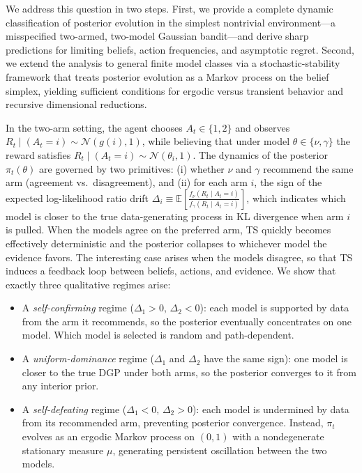 \documentclass[12pt]{article}
\begin{document}
We address this question in two steps. First, we provide a complete dynamic classification of posterior evolution in the simplest nontrivial environment---a misspecified two-armed, two-model Gaussian bandit---and derive sharp predictions for limiting beliefs, action frequencies, and asymptotic regret. Second, we extend the analysis to general finite model classes via a stochastic-stability framework that treats posterior evolution as a Markov process on the belief simplex, yielding sufficient conditions for ergodic versus transient behavior and recursive dimensional reductions.

In the two-arm setting, the agent chooses $A_t\in\{1,2\}$ and observes $R_t\mid(A_t=i)\sim\mathcal N(g(i),1)$, while believing that under model $\theta\in\{\nu,\gamma\}$ the reward satisfies $R_t\mid(A_t=i)\sim\mathcal N(\theta_i,1)$. The dynamics of the posterior $\pi_t(\theta)$ are governed by two primitives: (i) whether $\nu$ and $\gamma$ recommend the same arm (agreement vs.\ disagreement), and (ii) for each arm $i$, the sign of the expected log-likelihood ratio drift $\Delta_i\equiv\mathbb E[\frac{f_\nu (R_t \mid A_t = i) }{f_\gamma (R_t \mid A_t=i)}]$, which indicates which model is closer to the true data-generating process in KL divergence when arm $i$ is pulled. When the models agree on the preferred arm, TS quickly becomes effectively deterministic and the posterior collapses to whichever model the evidence favors. The interesting case arises when the models disagree, so that TS induces a feedback loop between beliefs, actions, and evidence. We show that exactly three qualitative regimes arise:
\begin{itemize}
    \item A \emph{self-confirming} regime ($\Delta_1>0,\,\Delta_2<0$): each model is supported by data from the arm it recommends, so the posterior eventually concentrates on one model. Which model is selected is random and path-dependent.
    \item A \emph{uniform-dominance} regime ($\Delta_1$ and $\Delta_2$ have the same sign): one model is closer to the true DGP under both arms, so the posterior converges to it from any interior prior.
    \item A \emph{self-defeating} regime ($\Delta_1<0,\,\Delta_2>0$): each model is undermined by data from its recommended arm, preventing posterior convergence. Instead, $\pi_t$ evolves as an ergodic Markov process on $(0,1)$ with a nondegenerate stationary measure $\mu$, generating persistent oscillation between the two models.
\end{itemize}
\end{document}
